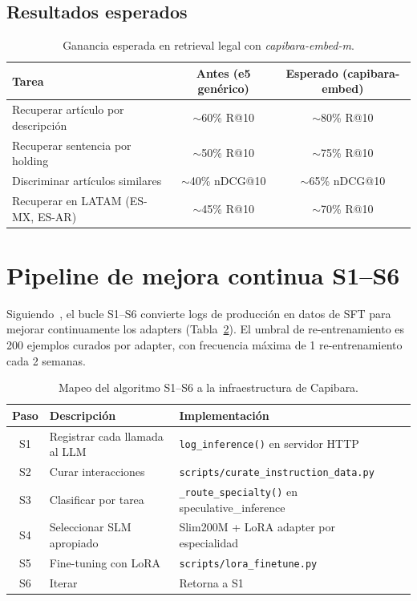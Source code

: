 \documentclass[11pt,a4paper]{article}
\begin{document}
\subsection{Resultados esperados}

\begin{table}[h]
\centering
\caption{Ganancia esperada en retrieval legal con \textit{capibara-embed-m}.}
\label{tab:retrieval}
\begin{tabular}{lcc}
\toprule
\textbf{Tarea} & \textbf{Antes (e5 genérico)} & \textbf{Esperado (capibara-embed)} \\
\midrule
Recuperar artículo por descripción & $\sim$60\% R@10 & $\sim$80\% R@10 \\
Recuperar sentencia por holding    & $\sim$50\% R@10 & $\sim$75\% R@10 \\
Discriminar artículos similares    & $\sim$40\% nDCG@10 & $\sim$65\% nDCG@10 \\
Recuperar en LATAM (ES-MX, ES-AR)  & $\sim$45\% R@10 & $\sim$70\% R@10 \\
\bottomrule
\end{tabular}
\end{table}

\section{Pipeline de mejora continua S1--S6}
\label{sec:s1s6}

Siguiendo~\citet{belcak2025small}, el bucle S1--S6 convierte logs de producción
en datos de SFT para mejorar continuamente los adapters (Tabla~\ref{tab:s1s6}).
El umbral de re-entrenamiento es 200 ejemplos curados por adapter, con frecuencia
máxima de 1 re-entrenamiento cada 2 semanas.

\begin{table}[h]
\centering
\caption{Mapeo del algoritmo S1--S6 a la infraestructura de Capibara.}
\label{tab:s1s6}
\begin{tabular}{clll}
\toprule
\textbf{Paso} & \textbf{Descripción} & \textbf{Implementación} \\
\midrule
S1 & Registrar cada llamada al LLM & \texttt{log\_inference()} en servidor HTTP \\
S2 & Curar interacciones & \texttt{scripts/curate\_instruction\_data.py} \\
S3 & Clasificar por tarea & \texttt{\_route\_specialty()} en speculative\_inference \\
S4 & Seleccionar SLM apropiado & Slim200M + LoRA adapter por especialidad \\
S5 & Fine-tuning con LoRA & \texttt{scripts/lora\_finetune.py} \\
S6 & Iterar & Retorna a S1 \\
\bottomrule
\end{tabular}
\end{table}
\end{document}
